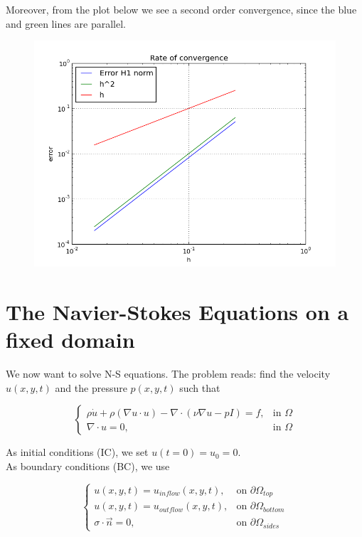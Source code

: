 \documentclass[11pt,a4paper,titlepage]{report}
\begin{document}
Moreover, from the plot below we see a second order convergence, since the blue and green lines are parallel.

\vspace{1cm}
\begin{figure}[ht]
\centering
\includegraphics[width=\textwidth]{convergence_sine}
\end{figure}
\vspace{1cm}



\section{The Navier-Stokes Equations on a fixed domain}
We now want to solve N-S equations. The problem reads: find the velocity $u(x,y,t)$ and the pressure $p(x,y,t)$ such that

\[
\begin{cases}
\rho \dot{u} + \rho (\nabla u \cdot u) - \nabla \cdot (\nu \nabla u - pI) = f, & \mbox{in } \Omega \\
\nabla \cdot u = 0, & \mbox{in } \Omega
\end{cases}
\]

As initial conditions (IC), we set $u(t=0) = u_0 = 0$. \\
As boundary conditions (BC), we use

\[
\begin{cases}
u(x,y,t) = u_{inflow}(x,y,t) , & \mbox{on } \partial \Omega_{top} \\
u(x,y,t) = u_{outflow}(x,y,t) , & \mbox{on } \partial \Omega_{bottom} \\
\sigma \cdot \vec{n} = 0,  & \mbox{on } \partial \Omega_{sides}
\end{cases}
\]
\end{document}
